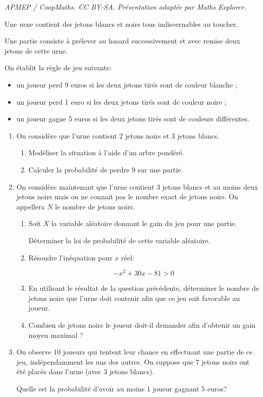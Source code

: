 \documentclass[10pt]{article}
\providecommand{\euro}{\texteuro}
\providecommand{\euro}{{\text{€}}}
\renewcommand{\euro}{\ifmmode\text{\texteuro}\else\texteuro\fi}
\begin{document}
\noindent\textit{APMEP / CoopMaths. CC BY-SA. Présentation adaptée par Maths Explorer.}\par\medskip
\medskip

Une urne contient des jetons blancs et noirs tous indiscernables au toucher.

Une partie consiste à prélever au hasard successivement et avec remise deux jetons de cette urne.

On établit la règle de jeu suivante:

\setlength\parindent{1cm}
\begin{itemize}
\item[$\bullet~~$] un joueur perd 9 euros si les deux jetons tirés sont de couleur blanche ;
\item[$\bullet~~$] un joueur perd 1 euro si les deux jetons tirés sont de couleur noire ;
\item[$\bullet~~$] un joueur gagne 5 euros si les deux jetons tirés sont de couleurs différentes.
\end{itemize}
\setlength\parindent{0cm}

\medskip

\begin{enumerate}
\item On considère que l'urne contient 2 jetons noirs et 3 jetons blancs.
	\begin{enumerate}
		\item Modéliser la situation à l'aide d'un arbre pondéré.
		\item Calculer la probabilité de perdre $9$ \euro{} sur une partie.
	\end{enumerate}	
\item On considère maintenant que l'urne contient 3 jetons blancs et au moins deux jetons noirs mais on ne connait pas le nombre exact de jetons noirs. On appellera $N$ le nombre de jetons noirs.
	\begin{enumerate}
		\item Soit $X$ la variable aléatoire donnant le gain du jeu pour une partie.
		
Déterminer la loi de probabilité de cette variable aléatoire.
		\item Résoudre l'inéquation pour $x$ réel:
		
\[-x^2  + 30x - 81 > 0\]

		\item En utilisant le résultat de la question précédente, déterminer le nombre de jetons noirs que l'urne doit contenir afin que ce jeu soit favorable au joueur.
		\item Combien de jetons noirs le joueur doit-il demander afin d'obtenir un gain moyen maximal ?
	\end{enumerate}
\item On observe $10$ joueurs qui tentent leur chance en effectuant une partie de ce jeu, indépendamment les uns des autres. On suppose que 7 jetons noirs ont été placés dans l'urne (avec 3 jetons blancs). 

Quelle est la probabilité d'avoir au moins $1$ joueur gagnant $5$ euros?
\end{enumerate}
\end{document}
